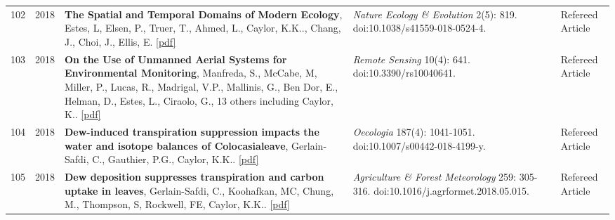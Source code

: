 \begin{longtable}{lcp{7.75cm}>{\raggedright}p{5.25cm}p{1.75cm}}
102 & 2018 & {\bf The Spatial and Temporal Domains of Modern Ecology}, Estes, L, Elsen, P., Truer, T., Ahmed, L., Caylor, K.K.., Chang, J., Choi, J., Ellis, E. \href{https://ucsb.box.com/s/olvjzv8gy0hx18etd0dam75bog8yp8zp}{[pdf]} & \emph{ Nature Ecology \& Evolution } 2(5): 819. doi:10.1038/s41559-018-0524-4.  & Refereed Article\\
103 & 2018 & {\bf On the Use of Unmanned Aerial Systems for Environmental Monitoring}, Manfreda, S., McCabe, M, Miller, P., Lucas, R., Madrigal, V.P., Mallinis, G., Ben Dor, E., Helman, D., Estes, L., Ciraolo, G., 13 others including Caylor, K.. \href{https://ucsb.box.com/s/c9ee5kg0gtyqw76r897u6viu73yvxtpd}{[pdf]} & \emph{ Remote Sensing } 10(4): 641. doi:10.3390/rs10040641.  & Refereed Article\\
104 & 2018 & {\bf Dew-induced transpiration suppression impacts the water and isotope balances of Colocasialeave}, Gerlain-Safdi, C., Gauthier, P.G., Caylor, K.K.. \href{https://ucsb.box.com/s/listbal649qlgbuqa8xb4ir82pz6o3us}{[pdf]} & \emph{ Oecologia } 187(4): 1041-1051. doi:10.1007/s00442-018-4199-y.  & Refereed Article\\
105 & 2018 & {\bf Dew deposition suppresses transpiration and carbon uptake in leaves}, Gerlain-Safdi, C., Koohafkan, MC, Chung, M., Thompson, S, Rockwell, FE, Caylor, K.K.. \href{https://ucsb.box.com/s/6v2kks339czfpp06xulu1ytgjyw4oon9}{[pdf]} & \emph{ Agriculture \& Forest Meteorology } 259: 305-316. doi:10.1016/j.agrformet.2018.05.015.  & Refereed Article\\
\end{longtable}


